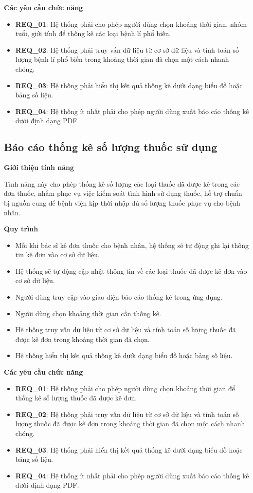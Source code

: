 \noindent \textbf{Các yêu cầu chức năng}

\begin{itemize}
  \item \textbf{REQ\_01}: Hệ thống phải cho phép người dùng chọn khoảng thời gian, nhóm tuổi, giới tính để thống kê các loại bệnh lí phổ biến.
  \item \textbf{REQ\_02}: Hệ thống phải truy vấn dữ liệu từ cơ sở dữ liệu và tính toán số lượng bệnh lí phổ biến trong khoảng thời gian đã chọn một cách nhanh chóng.
  \item \textbf{REQ\_03}: Hệ thống phải hiển thị kết quả thống kê dưới dạng biểu đồ hoặc bảng số liệu.
  \item \textbf{REQ\_04}: Hệ thống ít nhất phải cho phép người dùng xuất báo cáo thống kê dưới định dạng PDF.
\end{itemize}

\subsection{Báo cáo thống kê số lượng thuốc sử dụng}

\noindent \textbf{Giới thiệu tính năng}

Tính năng này cho phép thống kê số lượng các loại thuốc đã được kê trong các đơn thuốc, nhằm phục vụ việc kiểm soát tình hình sử dụng thuốc, hỗ trợ chuẩn bị nguồn cung để bệnh viện kịp thời nhập đủ số lượng thuốc phục vụ cho bệnh nhân.

\noindent \textbf{Quy trình}

\begin{itemize}
  \item Mỗi khi bác sĩ kê đơn thuốc cho bệnh nhân, hệ thống sẽ tự động ghi lại thông tin kê đơn vào cơ sở dữ liệu.
  \item Hệ thống sẽ tự động cập nhật thông tin về các loại thuốc đã được kê đơn vào cơ sở dữ liệu.
  \item Người dùng truy cập vào giao diện báo cáo thống kê trong ứng dụng.
  \item Người dùng chọn khoảng thời gian cần thống kê.
  \item Hệ thống truy vấn dữ liệu từ cơ sở dữ liệu và tính toán số lượng thuốc đã được kê đơn trong khoảng thời gian đã chọn.
  \item Hệ thống hiển thị kết quả thống kê dưới dạng biểu đồ hoặc bảng số liệu.
\end{itemize}

\noindent \textbf{Các yêu cầu chức năng}

\begin{itemize}
  \item \textbf{REQ\_01}: Hệ thống phải cho phép người dùng chọn khoảng thời gian để thống kê số lượng thuốc đã được kê đơn.
  \item \textbf{REQ\_02}: Hệ thống phải truy vấn dữ liệu từ cơ sở dữ liệu và tính toán số lượng thuốc đã được kê đơn trong khoảng thời gian đã chọn một cách nhanh chóng.
  \item \textbf{REQ\_03}: Hệ thống phải hiển thị kết quả thống kê dưới dạng biểu đồ hoặc bảng số liệu.
  \item \textbf{REQ\_04}: Hệ thống ít nhất phải cho phép người dùng xuất báo cáo thống kê dưới định dạng PDF.
\end{itemize}
